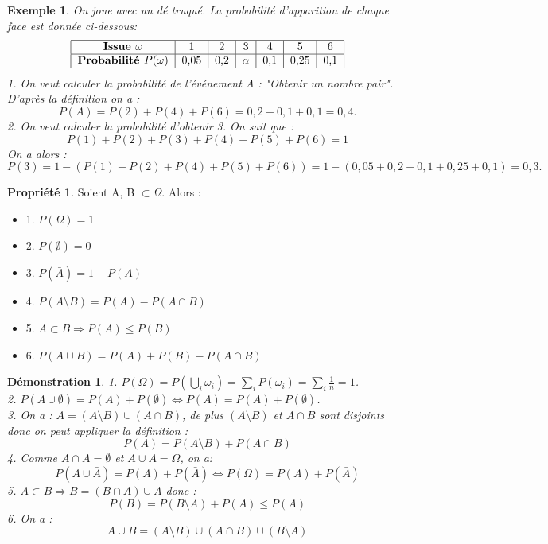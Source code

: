 \documentclass[a4paper,12pt,final]{article}
\newtheorem{Ex}{Exemple}[section]
\newtheorem{Proof}{Démonstration}[section]
\theoremstyle{theorem}
\theoremstyle{definition}
\newtheorem{Propriete}{Propriété}[section]
\theoremstyle{definition}
\theoremstyle{definition}
\begin{document}
		\begin{Ex}
			On joue avec un dé truqué. La probabilité d'apparition de chaque face est donnée ci-dessous: \[
			\begin{tabular}{|c|c|c|c|c|c|c|}
				\hline \textbf{Issue $\omega$} & 1 & 2 & 3 & 4 & 5 & 6 \\
				\hline \textbf{Probabilité $P(\omega)$} & 0,05 & 0,2 & $\alpha$ & 0,1 & 0,25 & 0,1 \\
				\hline
			\end{tabular} \]
			1. On veut calculer la probabilité de l'événement A : "Obtenir un nombre pair". D'après la définition on a :
			\[P(A) = P(2)+P(4)+P(6) = 0,2+0,1+0,1 = 0,4.\]
			2. On veut calculer la probabilité d'obtenir 3. On sait que :
			\[P(1)+P(2)+P(3)+P(4)+P(5)+P(6) = 1\]
			On a alors : 
			\[P(3) = 1 - (P(1)+P(2)+P(4)+P(5)+P(6)) = 1-(0,05+0,2+0,1+0,25+0,1) = 0,3.\]
		\end{Ex}
	
		\begin{Propriete}
			Soient A, B $\subset \Omega$. Alors :
			\begin{itemize}
				\item 1. $P(\Omega) = 1$
				\item 2. $P(\emptyset) = 0$
				\item 3. $P(\bar{A}) = 1-P(A)$
				\item 4. $P(A\setminus B) = P(A)-P(A\cap B)$
				\item 5. $A\subset B \Rightarrow P(A) \leq P(B)$
				\item 6. $P(A\cup B) = P(A)+P(B)-P(A\cap B)$
			\end{itemize}
		\end{Propriete}
	
		\begin{Proof}
			1. $P(\Omega) = P(\bigcup_{i} \omega_{i}) = \sum_{i} P(\omega_{i}) = \sum_{i}\frac{1}{n} = 1$. \\
			2. $P(A\cup \emptyset) = P(A) + P(\emptyset) \iff P(A) = P(A) + P(\emptyset)$. \\
			3. On a : $A = (A\setminus B)\cup (A\cap B)$, de plus $(A\setminus B)$ et $A\cap B$ sont disjoints donc on peut appliquer la définition : 
			\[P(A) = P(A\setminus B) + P(A\cap B)\]
			4. Comme $A\cap \bar{A} = \emptyset$ et $A\cup \bar{A} = \Omega$, on a:
			\[P(A\cup \bar{A}) = P(A) + P(\bar{A}) \iff P(\Omega) = P(A) + P(\bar{A})\]
			5. $A\subset B \Rightarrow B = (B\cap A)\cup A$ donc :
			\[P(B) = P(B\setminus A) + P(A) \leq P(A) \]
			6. On a :
			\[A\cup B = (A\setminus B)\cup (A\cap B)\cup (B\setminus A)\] 
		\end{Proof}
	
\end{document}

